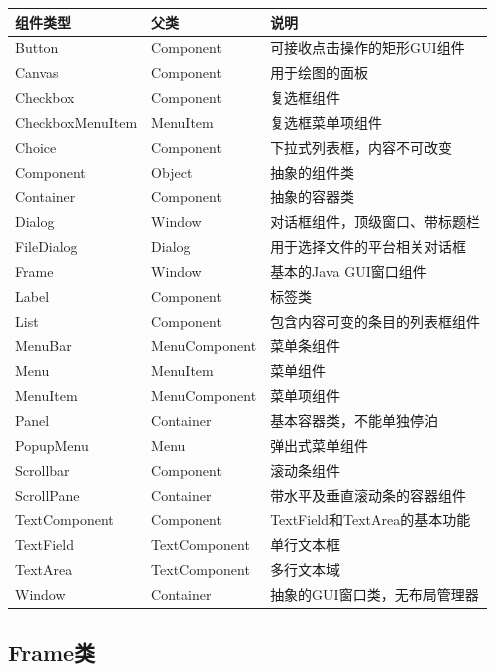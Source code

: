 \begin{table}
  \begin{tabular}{l|l|l}
    {\bf 组件类型} & {\bf 父类}  & {\bf 说明}\\
    \hline
    Button & Component & 可接收点击操作的矩形GUI组件\\
    Canvas & Component & 用于绘图的面板\\
    Checkbox & Component & 复选框组件\\
    CheckboxMenuItem & MenuItem & 复选框菜单项组件\\
    Choice & Component & 下拉式列表框，内容不可改变\\
    Component & Object & 抽象的组件类\\
    Container & Component & 抽象的容器类\\
    Dialog & Window & 对话框组件，顶级窗口、带标题栏\\
    FileDialog & Dialog & 用于选择文件的平台相关对话框\\
    Frame & Window & 基本的Java GUI窗口组件\\
    Label & Component & 标签类\\
    List & Component & 包含内容可变的条目的列表框组件\\
    MenuBar & MenuComponent & 菜单条组件\\
    Menu & MenuItem & 菜单组件\\
    MenuItem & MenuComponent & 菜单项组件\\
    Panel & Container & 基本容器类，不能单独停泊\\
    PopupMenu & Menu & 弹出式菜单组件\\
    Scrollbar & Component & 滚动条组件\\
    ScrollPane & Container & 带水平及垂直滚动条的容器组件\\
    TextComponent & Component & TextField和TextArea的基本功能\\
    TextField & TextComponent & 单行文本框\\
    TextArea & TextComponent & 多行文本域\\
    Window & Container & 抽象的GUI窗口类，无布局管理器\\
  \end{tabular}
\end{table}

\subsection{Frame类}

